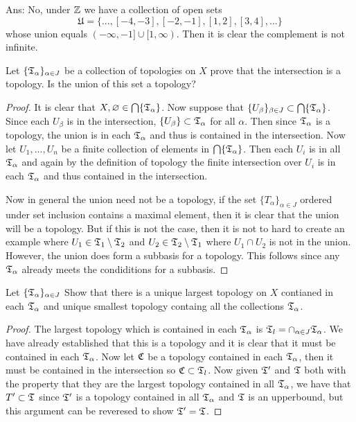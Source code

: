 Ans: No, under $\mathbb{Z}$ we have a collection of open sets 
\[ \mathfrak{U} = \{ ... , [-4, -3], [-2, -1], [1, 2], [3, 4], ... \}\] 
whose union equals $(-\infty, -1] \cup [1, \infty)$. Then it is clear the complement is not infinite. 

\question 

\begin{alphaparts}
\questionpart
Let $\{\mathfrak{T}_\alpha\}_{\alpha \in J}$ be a collection of topologies on $X$ prove that the intersection is a topology. Is the union of this set a topology? 


\begin{proof}
    It is clear that $X, \varnothing \in \bigcap \{\mathfrak{T}_\alpha\}$. Now suppose that $\{U_\beta\}_{\beta \in J} \subset \bigcap \{\mathfrak{T}_\alpha\}$. 
    Since each $U_\beta$ is in the intersection, $\{U_\beta\} \subset \mathfrak{T}_\alpha$ for all $\alpha$. Then since $\mathfrak{T}_\alpha$ is a topology, 
    the union is in each $\mathfrak{T}_\alpha$ and thus is contained in the intersection. Now let $U_1, ..., U_n$ be a finite collection of elements in 
    $\bigcap \{\mathfrak{T}_\alpha\}$. Then each $U_i$ is in all $\mathfrak{T}_\alpha$ and again by the definition of topology the finite intersection over $U_i$ is in each 
    $\mathfrak{T}_\alpha$ and thus contained in the intersection. 

    Now in general the union need not be a topology, if the set $\{T_\alpha\}_{\alpha \in J}$ ordered under set inclusion contains a maximal element, then it is clear that the union will be a topology. 
    But if this is not the case, then it is not to hard to create an example where $U_1 \in \mathfrak{T}_1 \setminus \mathfrak{T}_2$ and $U_2 \in \mathfrak{T}_2 \setminus \mathfrak{T}_1$ where $U_1 \cap U_2$ is not in the union. However, 
    the union does form a subbasis for a topology. This follows since any $\mathfrak{T}_\alpha$ already meets the condiditions for a subbasis.
    
\end{proof}

\questionpart 
Let $\{\mathfrak{T}_\alpha\}_{\alpha \in J} $ Show that there is a unique largest topology on $X$ contianed in each $\mathfrak{T}_\alpha$ and unique smallest topology containg all the collections $\mathfrak{T}_\alpha$. 

\begin{proof}
    The largest topology which is contained in each $\mathfrak{T}_\alpha$ is $\mathfrak{T}_l = \cap_{\alpha \in J } \mathfrak{T}_\alpha$. We have already established that this is a topology and it is clear that it must be contained in each $\mathfrak{T}_\alpha$. Now let $\mathfrak{C}$ be a topology 
    contained in each $\mathfrak{T}_\alpha$, then it must be contained in the intersection so $\mathfrak{C} \subset \mathfrak{T}_l$. Now given $\mathfrak{T}^\prime $ and $\mathfrak{T}$ both with the property that they are the largest topology contained in all $\mathfrak{T}_\alpha$, we have that 
    $T^\prime \subset \mathfrak{T}$ since $\mathfrak{T}^\prime$ is a topology contained in all $\mathfrak{T}_\alpha$ and $\mathfrak{T}$ is an upperbound, but this argument can be reveresed to show $\mathfrak{T}^\prime = \mathfrak{T}$. 


\end{proof}
\end{alphaparts}

